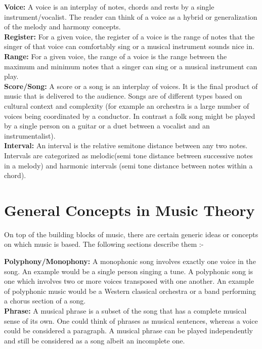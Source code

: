 \noindent \textbf{Voice:} \label{voice} A voice is an interplay of notes, chords and rests by a single instrument/vocalist. The reader can think of a voice as a hybrid or generalization of the melody and harmony concepts. \\

\noindent \textbf{Register:} For a given voice, the register of a voice is the range of notes that the singer of that voice can comfortably sing or a musical instrument sounds nice in. \\

\noindent \textbf{Range:} For a given voice, the range of a voice is the range between the maximum and minimum notes that a singer can sing or a musical instrument can play.  \\

\noindent \textbf{Score/Song:} A score or a song is an interplay of voices. It is the final product of music that is delivered to the audience. Songs are of different types based on cultural context and complexity (for example an orchestra is a large number of voices being coordinated by a conductor. In contrast a folk song might be played by a single person on a guitar or a duet between a vocalist and an instrumentalist). \\

\noindent \textbf{Interval:} An interval is the relative semitone distance between any two notes. Intervals are categorized as melodic(semi tone distance between successive notes in a melody) and harmonic intervals (semi tone distance between notes within a chord).

\section{General Concepts in Music Theory}

\noindent On top of the building blocks of music, there are certain generic ideas or concepts on which music is based. The following sections describe them :-

\noindent \textbf{Polyphony/Monophony:} A monophonic song involves exactly one voice in the song. An example would be a single person singing a tune. A polyphonic song is one which involves two or more voices transposed with one another. An example of polyphonic music would be a Western classical orchestra or a band performing a chorus section of a song. \\

\noindent \textbf{Phrase:} A musical phrase is a subset of the song that has a complete musical sense of its own. One could think of phrases as musical sentences, whereas a voice could be considered a paragraph. A musical phrase can be played independently and still be considered as a song albeit an incomplete one. \\

